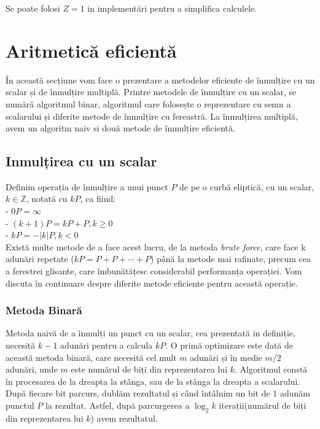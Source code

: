 \begin{obs}
Se poate folosi $Z = 1$ in implementări pentru a simplifica calculele.
\end{obs}

\section{Aritmetică eficientă}
\label{sec:sec02}

În această secțiune vom face o prezentare a metodelor eficiente de înmulțire cu un scalar și de înmulțire multiplă. Printre metodele de înmulțire cu un scalar, se numără algoritmul binar, algoritmul care folosește o reprezentare cu semn a scalarului și diferite metode de înmulțire cu fereastră. La înmulțirea multiplă, avem un algoritm naiv si două metode de înmulțire eficientă. 

\subsection{Inmulțirea cu un scalar}

\begin{dfn}
Definim operația de înmulțire a unui punct $P$ de pe o curbă eliptică, cu un scalar, $k\in \mathbb{Z}$, notată cu $kP$, ca fiind: \\
- $0P = \infty$ \\
- $(k+1)P = kP + P, k\geq 0$ \\
- $kP = -|k|P, k < 0$ \\
Există multe metode de a face acest lucru, de la metoda \textit{brute force}, care face k adunări repetate ($kP = P+P+\cdots +P$) până la metode mai rafinate, precum cea a ferestrei glisante, care îmbunătățesc considerabil performanța operației. Vom discuta în continuare despre diferite metode eficiente pentru această operație.
\end{dfn}

\subsubsection{Metoda Binară}

Metoda naivă de a înmulți un punct cu un scalar, cea prezentată in definiție, necesită $k-1$ adunări pentru a calcula $kP$. O primă optimizare este dată de această metoda binară, care necesită cel mult $m$ adunări \cite{binary} și în medie $m/2$ adunări, unde $m$ este numărul de biți din reprezentarea lui $k$. Algoritmul constă în procesarea de la dreapta la stânga, sau de la stânga la dreapta a scalarului. După fiecare bit parcurs, dublăm rezultatul și când întâlnim un bit de $1$ adunăm punctul $P$ la rezultat. Astfel, după parcurgerea a $\log_2 k$ iterații(numărul de biți din reprezentarea lui $k$) avem rezultatul.

